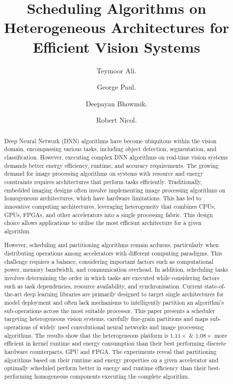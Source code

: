 \documentclass[]{spie}  %
\title{Scheduling Algorithms on Heterogeneous Architectures for Efficient Vision Systems}
\author[]{Teymoor Ali. }
\author[a,b]{George Paul. }
\author[a]{Deepayan Bhowmik.}
\author[b]{Robert Nicol.}
\affil[a]{Newcastle University, 1 Science Square, Newcastle upon Tyne, U.K}
\affil[b]{STMicroelectronics, 1 Tanfield, Inverleith Row, Edinburgh, U.K}
\begin{document}
 
\maketitle

\begin{abstract}
Deep Neural Network (DNN) algorithms have become ubiquitous within the vision domain, encompassing various tasks, including object detection, segmentation, and classification. However, executing complex DNN algorithms on real-time vision systems demands better energy efficiency, runtime, and accuracy requirements. The growing demand for image processing algorithms on systems with resource and energy constraints requires architectures that perform tasks efficiently. Traditionally, embedded imaging designs often involve implementing image processing algorithms on homogeneous architectures, which have hardware limitations. This has led to innovative computing architectures, leveraging heterogeneity that combines CPUs, GPUs, FPGAs, and other accelerators into a single processing fabric. This design choice allows applications to utilise the most efficient architecture for a given algorithm.

However, scheduling and partitioning algorithms remain arduous, particularly when distributing operations among accelerators with different computing paradigms. This challenge requires a balance, considering important factors such as computational power, memory bandwidth, and communication overhead. In addition, scheduling tasks involves determining the order in which tasks are executed while considering factors such as task dependencies, resource availability, and synchronisation. Current state-of-the-art deep learning libraries are primarily designed to target single architectures for model deployment and often lack mechanisms to intelligently partition an algorithm's sub-operations across the most suitable processor. This paper presents a scheduler targeting heterogeneous vision systems, carefully fine-grain partitions and maps sub-operations of widely used convolutional neural networks and image processing algorithms. The results show that the heterogeneous platform is $1.11\times$ \& $1.08\times$ more efficient in kernel runtime and energy consumption than their best performing discrete hardware counterparts, GPU and FPGA. The experiments reveal that partitioning algorithms based on their runtime and energy properties on a given accelerator and optimally scheduled perform better in energy and runtime efficiency than their best-performing homogeneous components executing the complete algorithm.
\end{abstract}
\end{document}
